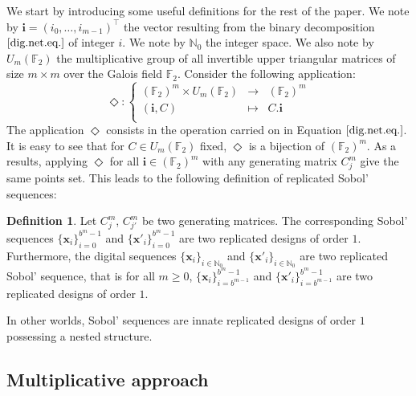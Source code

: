 \documentclass[]{elsarticle}
\theoremstyle{definition}
\newtheorem{defin}{Definition}
\newcommand{\bvec}[1]{\boldsymbol{#1}}
\newcommand{\vx}{\bvec{x}}
\newcommand{\vi}{\bvec{i}}
\begin{document}
We start by introducing some useful definitions for the rest of the paper. We note by $\vi=(i_{0},\dots,i_{m-1})^\intercal$ the vector resulting from the binary decomposition $\eqref{dig.net.eq.}$ of integer $i$. We note by $\mathbb{N}_0$ the integer space. We also note by $U_m(\mathbb{F}_2)$ the multiplicative group of all invertible upper triangular matrices of size $m\times m$ over the Galois field $\mathbb{F}_2$. Consider the following application:
\begin{equation*}
 \Diamond \colon \left\lbrace \begin{array}{ccccc} (\mathbb{F}_2)^m \times U_m(\mathbb{F}_2) & \to & (\mathbb{F}_2)^m \\
  (\vi,C) & \mapsto &  C . \vi \\
\end{array} \right.
\end{equation*}
The application $\Diamond$ consists in the operation carried on in Equation $\eqref{dig.net.eq.}$. It is easy to see that for $C \in U_m(\mathbb{F}_2)$ fixed, $\Diamond$ is a bijection of $(\mathbb{F}_2)^m$. As a results, applying $\Diamond$ for all $\vi \in (\mathbb{F}_2)^m$ with any generating matrix $C_j^m$ give the same points set. This leads to the following definition of replicated Sobol' sequences:
\begin{defin}
Let $C_j^m$, $C_{j'}^m$ be two generating matrices. The corresponding Sobol' sequences $\{\vx_i\}_{i=0}^{b^m-1}$ and $\{\vx'_i\}_{i=0}^{b^m-1}$ are two replicated designs of order $1$. Furthermore, the digital sequences $\{{\vx}_i\}_{i\in\mathbb{N}_0}$ and $\{{\vx'}_i\}_{i\in\mathbb{N}_0}$ are two replicated Sobol' sequence, that is for all $m \geq 0$, $\{{\vx}_i\}_{i=b^{m-1}}^{b^m-1}$ and $\{{\vx'}_i\}_{i=b^{m-1}}^{b^m-1}$ are two replicated designs of order $1$.
\end{defin}
In other worlds, Sobol' sequences are innate replicated designs of order $1$ possessing a nested structure.


\subsection{Multiplicative approach}
%
\end{document}
